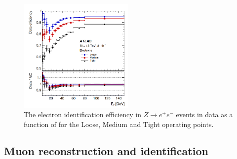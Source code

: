 \begin{figure}[H]
    \centering
    \includegraphics[width=0.5\textwidth]{Ch2/Img/Electron_ID_Eff.png}
    \caption{The electron identification efficiency in $Z\rightarrow e^+e^-$ events in data as a function of \eT for the Loose, Medium and Tight operating points.}
    \label{fig:chap2:Objects:Egamma:EID:Eff}
\end{figure}

\subsection{Muon reconstruction and identification}
\label{chap2:Objects:Muon}
